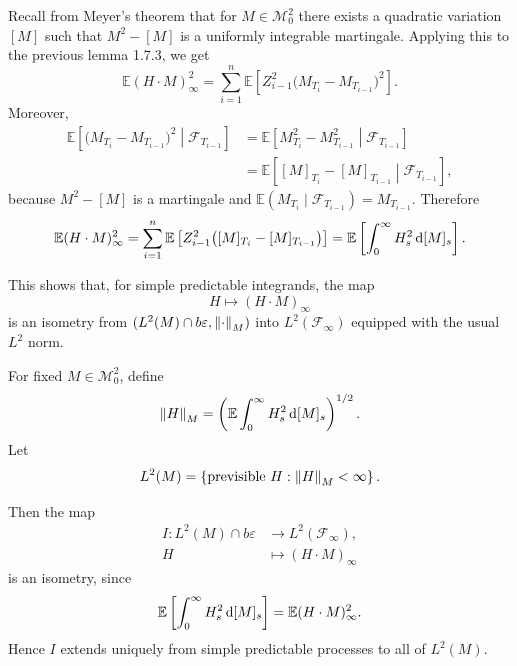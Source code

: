 Recall from Meyer's theorem that for $M \in \mathcal{M}_0^2$ there exists a quadratic variation $[M]$ such that $M^2 - [M]$ is a uniformly integrable martingale. Applying this to the previous lemma 1.7.3, we get
$$
    \mathbb{E}(H \cdot M)_\infty^2
    =
    \sum_{i=1}^n \mathbb{E}\left[
        Z_{i-1}^2\bigl(M_{T_i} - M_{T_{i-1}}\bigr)^2
    \right].
$$
Moreover,
$$
    \begin{aligned}
        \mathbb{E}\left[
            \bigl(M_{T_i} - M_{T_{i-1}}\bigr)^2 \middle| \mathcal{F}_{T_{i-1}}
        \right]
        &=
        \mathbb{E}\left[
            M_{T_i}^2 - M_{T_{i-1}}^2 \middle| \mathcal{F}_{T_{i-1}}
        \right] \\
        &=
        \mathbb{E}\left[
            [M]_{T_i} - [M]_{T_{i-1}} \middle| \mathcal{F}_{T_{i-1}}
        \right],
    \end{aligned}
$$
because $M^2 - [M]$ is a martingale and $\mathbb{E}(M_{T_i}\mid \mathcal{F}_{T_{i-1}})=M_{T_{i-1}}$.
Therefore
$$
    \mathbb{E}(H \cdot M)_\infty^2
    =
    \sum_{i=1}^{n}\mathbb{E}\left[
        Z_{i-1}^2\bigl([M]_{T_i} - [M]_{T_{i-1}}\bigr)
    \right]
    =
    \mathbb{E}\left[
        \int_0^\infty H_s^2 \mathop{}\!\mathrm{d} [M]_s
    \right].
$$

This shows that, for simple predictable integrands, the map
$$
    H \mapsto (H \cdot M)_\infty
$$
is an isometry from $(L^2(M)\cap b\varepsilon,\left\| \cdot \right\|_M)$ into $L^2(\mathcal{F}_\infty)$ equipped with the usual $L^2$ norm.

For fixed $M \in \mathcal{M}_0^2$, define
$$
    \left\| H \right\|_M
    =
    \left(
        \mathbb{E}\int_0^\infty H_s^2 \mathop{}\!\mathrm{d} [M]_s
    \right)^{1/2}.
$$
Let
$$
    L^2(M)
    =
    \left\{
        \text{previsible } H : \left\| H \right\|_M < \infty
    \right\}.
$$

Then the map
$$
\begin{aligned}
    I : L^2(M) \cap b\varepsilon &\to L^2(\mathcal{F}_\infty),\\
    H &\mapsto (H \cdot M)_\infty
\end{aligned}
$$
is an isometry, since
$$
    \mathbb{E}\left[
        \int_0^\infty H_s^2 \mathop{}\!\mathrm{d} [M]_s
    \right]
    =
    \mathbb{E}(H \cdot M)_\infty^2.
$$
Hence $I$ extends uniquely from simple predictable processes to all of $L^2(M)$.


